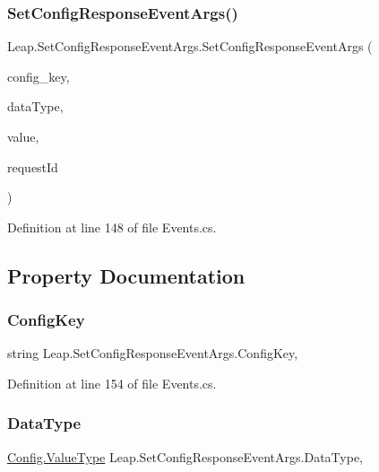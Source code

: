\subsubsection{\texorpdfstring{SetConfigResponseEventArgs()}{SetConfigResponseEventArgs()}}
{\footnotesize\ttfamily Leap.\+Set\+Config\+Response\+Event\+Args.\+Set\+Config\+Response\+Event\+Args (\begin{DoxyParamCaption}\item[{string}]{config\+\_\+key,  }\item[{\mbox{\hyperlink{class_leap_1_1_config_aee9819af7eacacc324aa72619310a9d8}{Config.\+Value\+Type}}}]{data\+Type,  }\item[{object}]{value,  }\item[{uint}]{request\+Id }\end{DoxyParamCaption})}



Definition at line 148 of file Events.\+cs.



\subsection{Property Documentation}
\mbox{\label{class_leap_1_1_set_config_response_event_args_a56eb4389fe7af0495d16764ccc7423c6}} 
\subsubsection{\texorpdfstring{ConfigKey}{ConfigKey}}
{\footnotesize\ttfamily string Leap.\+Set\+Config\+Response\+Event\+Args.\+Config\+Key\hspace{0.3cm}{\ttfamily [get]}, {\ttfamily [set]}}



Definition at line 154 of file Events.\+cs.

\mbox{\label{class_leap_1_1_set_config_response_event_args_a0efcba318f3be923944fc7958279f6d3}} 
\subsubsection{\texorpdfstring{DataType}{DataType}}
{\footnotesize\ttfamily \mbox{\hyperlink{class_leap_1_1_config_aee9819af7eacacc324aa72619310a9d8}{Config.\+Value\+Type}} Leap.\+Set\+Config\+Response\+Event\+Args.\+Data\+Type\hspace{0.3cm}{\ttfamily [get]}, {\ttfamily [set]}}




